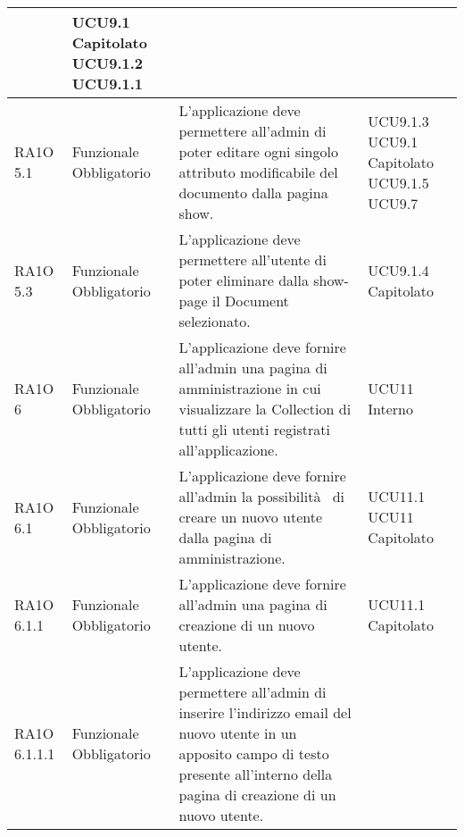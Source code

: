 \begin{center}
\begin{longtable}{ | l | p{2cm} | p{5cm} | p{1.7cm} |}
 &  UCU9.1 \newline  Capitolato \newline  UCU9.1.2 \newline  UCU9.1.1 \newline  \\ \hline      
        RA1O 5.1 & Funzionale \newline  Obbligatorio  & L'applicazione deve permettere all'admin di poter editare ogni singolo attributo modificabile del documento dalla pagina show. &  UCU9.1.3 \newline  UCU9.1 \newline  Capitolato \newline  UCU9.1.5 \newline  UCU9.7 \newline  \\ \hline      
        RA1O 5.3 & Funzionale \newline  Obbligatorio  & L'applicazione deve permettere all'utente di poter eliminare dalla show-page il Document selezionato. &  UCU9.1.4 \newline  Capitolato \newline  \\ \hline      
        RA1O 6 & Funzionale \newline  Obbligatorio  & L'applicazione deve fornire all'admin una pagina di amministrazione in cui visualizzare la Collection di tutti gli utenti registrati all'applicazione.
 &  UCU11 \newline  Interno \newline  \\ \hline      
        RA1O 6.1  & Funzionale \newline  Obbligatorio  & L'applicazione deve fornire all'admin la possibilità  di creare un nuovo utente dalla pagina di amministrazione. &  UCU11.1 \newline  UCU11 \newline  Capitolato \newline  \\ \hline      
        RA1O 6.1.1  & Funzionale \newline  Obbligatorio  & L'applicazione deve fornire all'admin una pagina di creazione di un nuovo utente. &  UCU11.1 \newline  Capitolato \newline  \\ \hline      
        RA1O 6.1.1.1  & Funzionale \newline  Obbligatorio  & L'applicazione deve permettere all'admin di inserire l'indirizzo email del nuovo utente in un apposito campo di testo presente all'interno della pagina di creazione di un nuovo utente.

\end{longtable}
\end{center}

